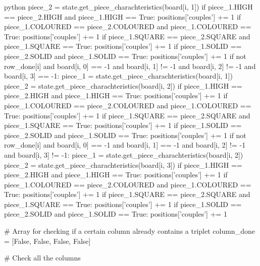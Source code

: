 \begin{mintedbox}{python}
            piece_2 = state.get_piece_charachteristics(board[i, 1])
            if piece_1.HIGH == piece_2.HIGH and piece_1.HIGH == True:
                positions['couples'] += 1
            if piece_1.COLOURED == piece_2.COLOURED and piece_1.COLOURED == True:
                positions['couples'] += 1
            if piece_1.SQUARE == piece_2.SQUARE and piece_1.SQUARE == True:
                positions['couples'] += 1
            if piece_1.SOLID == piece_2.SOLID and piece_1.SOLID == True:
                positions['couples'] += 1
        if not row_done[i] and board[i, 0] == -1 and board[i, 1] != -1 and board[i, 2] != -1 and board[i, 3] == -1:
            piece_1 = state.get_piece_charachteristics(board[i, 1])
            piece_2 = state.get_piece_charachteristics(board[i, 2])
            if piece_1.HIGH == piece_2.HIGH and piece_1.HIGH == True:
                positions['couples'] += 1
            if piece_1.COLOURED == piece_2.COLOURED and piece_1.COLOURED == True:
                positions['couples'] += 1
            if piece_1.SQUARE == piece_2.SQUARE and piece_1.SQUARE == True:
                positions['couples'] += 1
            if piece_1.SOLID == piece_2.SOLID and piece_1.SOLID == True:
                positions['couples'] += 1
        if not row_done[i] and board[i, 0] == -1 and board[i, 1] == -1 and board[i, 2] != -1 and board[i, 3] != -1:
            piece_1 = state.get_piece_charachteristics(board[i, 2])
            piece_2 = state.get_piece_charachteristics(board[i, 3])
            if piece_1.HIGH == piece_2.HIGH and piece_1.HIGH == True:
                positions['couples'] += 1
            if piece_1.COLOURED == piece_2.COLOURED and piece_1.COLOURED == True:
                positions['couples'] += 1
            if piece_1.SQUARE == piece_2.SQUARE and piece_1.SQUARE == True:
                positions['couples'] += 1
            if piece_1.SOLID == piece_2.SOLID and piece_1.SOLID == True:
                positions['couples'] += 1

    # Array for checking if a certain column already contains a triplet
    column_done = [False, False, False, False]

    # Check all the columns


\end{mintedbox}
